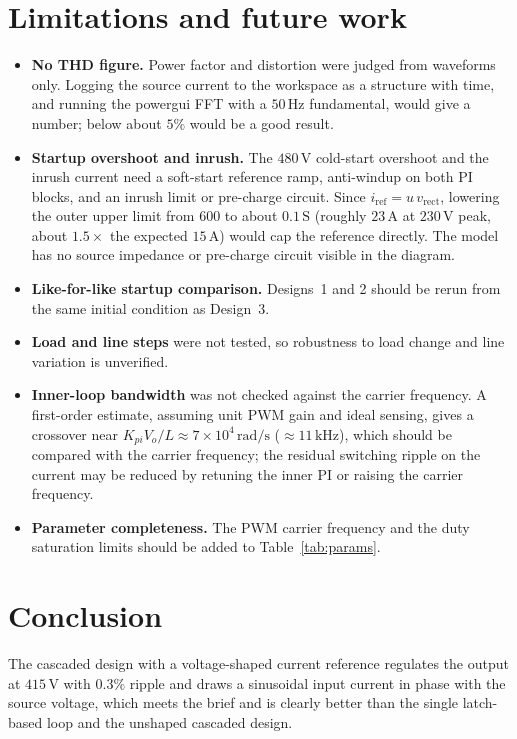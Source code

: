 \documentclass[11pt,a4paper]{article}
\begin{document}
\section{Limitations and future work}
\begin{itemize}[nosep]
  \item \textbf{No THD figure.} Power factor and distortion were judged from waveforms only. Logging the source current to the workspace as a structure with time, and running the powergui FFT with a $50\,\mathrm{Hz}$ fundamental, would give a number; below about $5\%$ would be a good result.
  \item \textbf{Startup overshoot and inrush.} The $480\,\mathrm{V}$ cold-start overshoot and the inrush current need a soft-start reference ramp, anti-windup on both PI blocks, and an inrush limit or pre-charge circuit. Since $i_\mathrm{ref}=u\,v_\mathrm{rect}$, lowering the outer upper limit from $600$ to about $0.1\,\mathrm{S}$ (roughly $23\,\mathrm{A}$ at $230\,\mathrm{V}$ peak, about $1.5\times$ the expected $15\,\mathrm{A}$) would cap the reference directly. The model has no source impedance or pre-charge circuit visible in the diagram.
  \item \textbf{Like-for-like startup comparison.} Designs~1 and 2 should be rerun from the same initial condition as Design~3.
  \item \textbf{Load and line steps} were not tested, so robustness to load change and line variation is unverified.
  \item \textbf{Inner-loop bandwidth} was not checked against the carrier frequency. A first-order estimate, assuming unit PWM gain and ideal sensing, gives a crossover near $K_{pi}V_o/L\approx 7\times 10^4\,\mathrm{rad/s}$ ($\approx 11\,\mathrm{kHz}$), which should be compared with the carrier frequency; the residual switching ripple on the current may be reduced by retuning the inner PI or raising the carrier frequency.
  \item \textbf{Parameter completeness.} The PWM carrier frequency and the duty saturation limits should be added to Table~\ref{tab:params}.
\end{itemize}

\section{Conclusion}
The cascaded design with a voltage-shaped current reference regulates the output at $415\,\mathrm{V}$ with $0.3\%$ ripple and draws a sinusoidal input current in phase with the source voltage, which meets the brief and is clearly better than the single latch-based loop and the unshaped cascaded design.
\end{document}
